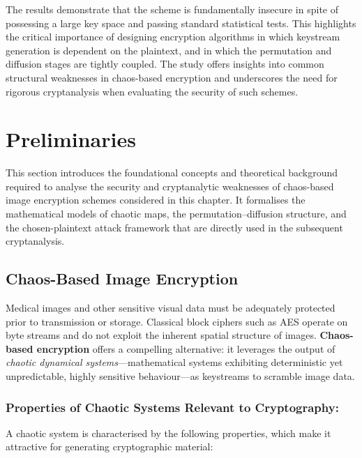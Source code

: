 The results demonstrate that the scheme is fundamentally insecure in spite of possessing a large key space and passing standard statistical tests. This highlights the critical importance of designing encryption algorithms in which keystream generation is dependent on the plaintext, and in which the permutation and diffusion stages are tightly coupled. The study offers insights into common structural weaknesses in chaos-based encryption and underscores the need for rigorous cryptanalysis when evaluating the security of such schemes.

\section{Preliminaries}
This section introduces the foundational concepts and theoretical background required to analyse the security and cryptanalytic weaknesses of chaos-based image encryption schemes considered in this chapter. It formalises the mathematical models of chaotic maps, the permutation–diffusion structure, and the chosen-plaintext attack framework that are directly used in the subsequent cryptanalysis.

\subsection{Chaos-Based Image Encryption}

Medical images and other sensitive visual data must be adequately protected prior to transmission or storage. Classical block ciphers such as AES operate on byte streams and do not exploit the inherent spatial structure of images. \textbf{Chaos-based encryption} offers a compelling alternative: it leverages the output of \emph{chaotic dynamical systems}---mathematical systems exhibiting deterministic yet unpredictable, highly sensitive behaviour---as keystreams to scramble image data.

\subsubsection{Properties of Chaotic Systems Relevant to Cryptography:}

A chaotic system is characterised by the following properties, which make it attractive for generating cryptographic material:

